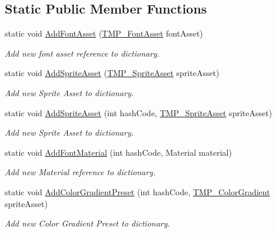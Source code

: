 \subsection*{Static Public Member Functions}
\begin{DoxyCompactItemize}
\item 
static void \mbox{\hyperlink{class_t_m_pro_1_1_material_reference_manager_aef7197e07d5b322b6ed3d8baf4d8c0cf}{Add\+Font\+Asset}} (\mbox{\hyperlink{class_t_m_pro_1_1_t_m_p___font_asset}{T\+M\+P\+\_\+\+Font\+Asset}} font\+Asset)
\begin{DoxyCompactList}\small\item\em Add new font asset reference to dictionary. \end{DoxyCompactList}\item 
static void \mbox{\hyperlink{class_t_m_pro_1_1_material_reference_manager_a3810186f9c82e44d3ca54ed456f6d8bd}{Add\+Sprite\+Asset}} (\mbox{\hyperlink{class_t_m_pro_1_1_t_m_p___sprite_asset}{T\+M\+P\+\_\+\+Sprite\+Asset}} sprite\+Asset)
\begin{DoxyCompactList}\small\item\em Add new Sprite Asset to dictionary. \end{DoxyCompactList}\item 
static void \mbox{\hyperlink{class_t_m_pro_1_1_material_reference_manager_a6ec369694dfd5ba0c8dbebcbc7bd1f97}{Add\+Sprite\+Asset}} (int hash\+Code, \mbox{\hyperlink{class_t_m_pro_1_1_t_m_p___sprite_asset}{T\+M\+P\+\_\+\+Sprite\+Asset}} sprite\+Asset)
\begin{DoxyCompactList}\small\item\em Add new Sprite Asset to dictionary. \end{DoxyCompactList}\item 
static void \mbox{\hyperlink{class_t_m_pro_1_1_material_reference_manager_ad32f019ea73193084d8e7f90f387b679}{Add\+Font\+Material}} (int hash\+Code, Material material)
\begin{DoxyCompactList}\small\item\em Add new Material reference to dictionary. \end{DoxyCompactList}\item 
static void \mbox{\hyperlink{class_t_m_pro_1_1_material_reference_manager_aaff4d63fa8a94aa0b4badb98076ce0b3}{Add\+Color\+Gradient\+Preset}} (int hash\+Code, \mbox{\hyperlink{class_t_m_pro_1_1_t_m_p___color_gradient}{T\+M\+P\+\_\+\+Color\+Gradient}} sprite\+Asset)
\begin{DoxyCompactList}\small\item\em Add new Color Gradient Preset to dictionary. \end{DoxyCompactList}\item 

\end{DoxyCompactItemize}
